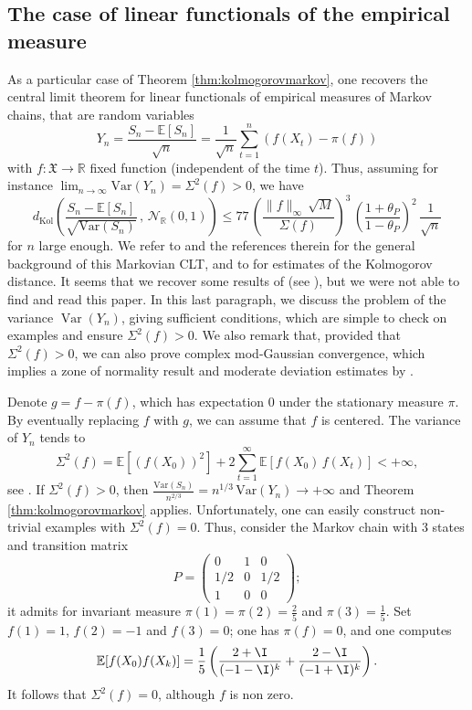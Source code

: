 \documentclass[envcountsame]{svmult}
\newcommand{\R}{\mathbb{R}}
\newcommand{\esper}{\mathbb{E}}
\newcommand{\dkol}{d_\mathrm{Kol}}
\newcommand{\spa}{\mathfrak{X}}
\newcommand{\var}{\mathrm{Var}}
\newcommand{\gauss}{\mathcal{N}_{\R}(0,1)}
\DeclareMathOperator{\Var}{Var}
\begin{document}
 

\subsection{The case of linear functionals of the empirical measure} 
As a particular case of Theorem \ref{thm:kolmogorovmarkov},
one recovers the central limit theorem for linear functionals of empirical measures of Markov chains, that are random variables
$$Y_n = \frac{S_n-\esper[S_n]}{\sqrt{n}} =  \frac{1}{\sqrt{n}} \sum_{t=1}^n (f(X_t) - \pi(f))$$
with $f : \spa \to \R$ fixed function (independent of the time $t$). Thus, assuming for instance $\lim_{n \to \infty} \var(Y_n) = \varSigma^2(f)>0$, we have
\begin{equation}
\dkol\left(\frac{S_n - \esper[S_n]}{\sqrt{\var(S_n)}}\,,\,\gauss\right) \leq 77\,\left(\frac{\|f\|_\infty\,\sqrt{M}}{\varSigma(f)}\right)^{\!3}\,\left(\frac{1+\theta_P}{1-\theta_P}\right)^2\,\frac{1}{\sqrt{n}}\label{eq:boundlinearfunctional}
\end{equation}
for $n$ large enough. We refer to \cite{Cog72,KV86,Jon04,Hagg05} and the references therein for the general background of this Markovian CLT, and to \cite{Bol80,Lez96,Mann96} for estimates of the Kolmogorov distance. It seems that we recover some results of \cite{Mann96} (see \cite[\S 2.1.3]{SC97}), but we were not able to find and read this paper. In this last paragraph, we discuss the problem of the variance $\Var(Y_n)$,
giving sufficient conditions, which are simple to check on examples and ensure $\varSigma^2(f)>0$.
We also remark that, provided that $\varSigma^2(f)>0$,
we can also prove complex mod-Gaussian convergence, which implies a zone of normality result and moderate deviation estimates by \cite{FMN16}.\bigskip

Denote $g = f - \pi(f)$, which has expectation $0$ under the stationary measure $\pi$.
By eventually replacing $f$ with $g$, we can assume that $f$ is centered.
The variance of $Y_n$ tends to
$$\varSigma^2(f) = \esper[(f(X_0))^2]+2\sum_{t=1}^\infty \esper[f(X_0)\,f(X_t)]<+\infty,$$
see \cite[Lemma 3.3]{Cog72}. If $\varSigma^2(f)>0$, then $\frac{\var(S_n)}{n^{2/3}} = n^{1/3}\,\var(Y_n) \to + \infty$ and Theorem \ref{thm:kolmogorovmarkov} applies. Unfortunately, one can easily construct non-trivial examples with \hbox{$\varSigma^2(f)=0$}. Thus, consider the Markov chain with $3$ states and transition matrix
$$P=\begin{pmatrix}
0 & 1 & 0 \\
1/2 & 0 & 1/2 \\
1 & 0 & 0
\end{pmatrix};$$
it admits for invariant measure $\pi(1)=\pi(2)=\frac{2}{5}$ and $\pi(3)=\frac{1}{5}$. Set $f(1)=1$, $f(2)=-1$ and $f(3)=0$; one has $\pi(f)=0$, and one computes 
$$\esper[f(X_0)f(X_k)] = \frac{1}{5} \left(\frac{2+\I}{(-1-\I)^k} + \frac{2-\I}{(-1+\I)^k}\right).$$
It follows that $\varSigma^2(f)=0$, although $f$ is non zero.\medskip
\end{document}
